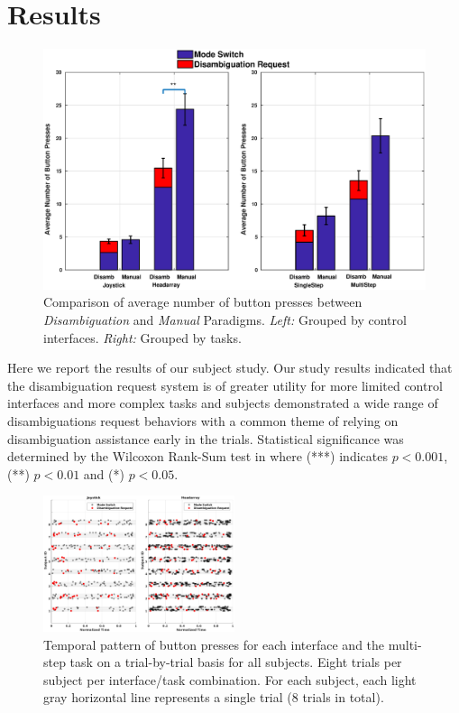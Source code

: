 \documentclass[journal]{IEEEtran}
\begin{document}
\section{Results}\label{sec:results}
\begin{figure}[b]
	\centering
	\includegraphics[keepaspectratio, width = 1\hsize ,left]{./figures/Fig8_New.eps}
	\caption{Comparison of average number of button presses between \textit{Disambiguation} and \textit{Manual} Paradigms. \textit{Left:} Grouped by control interfaces. \textit{Right:} Grouped by tasks.}
	\label{fig:button_press}
\end{figure}
Here we report the results of our subject study. Our study results indicated that the disambiguation request system is of greater utility for more limited control interfaces and more complex tasks and subjects demonstrated a wide range of disambiguations request behaviors with a common theme of relying on disambiguation assistance early in the trials.  Statistical significance was determined by the Wilcoxon Rank-Sum test in where (***) indicates $p < 0.001$, (**) $p < 0.01$ and (*) $p < 0.05$.
\begin{figure}[t!]
	\centering
	\includegraphics[width = 0.5\textwidth,center]{./figures/Fig9.eps}
	\vspace{-1cm}
	\caption{Temporal pattern of button presses for each interface and the multi-step task on a trial-by-trial basis for all subjects. Eight trials per subject per interface/task combination. For each subject, each light gray horizontal line represents a single trial (8 trials in total).}
	\label{fig:ha_man_disamb}
\end{figure}
\end{document}
